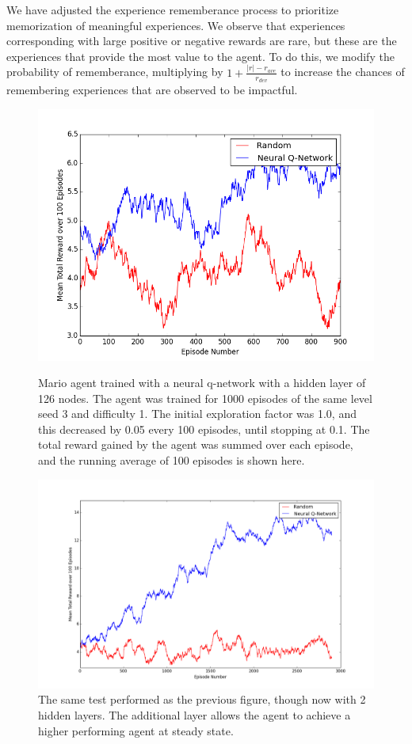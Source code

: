 \documentclass{article}
\begin{document}
We have adjusted the experience rememberance process to prioritize memorization of meaningful experiences. We observe that experiences corresponding with large positive or negative rewards are rare, but these are the experiences that provide the most value to the agent. To do this, we modify the probability of rememberance, multiplying by $1 + \frac{|r| - r_{ave}}{r_{dev}}$ to increase the chances of remembering experiences that are observed to be impactful.

 \begin{figure}
 \begin{center}
\includegraphics[scale=0.42]{seed3.png}
\caption{Mario agent trained with a neural q-network with a hidden layer of 126 nodes. The agent was trained for 1000 episodes of the same level seed 3 and difficulty 1. The initial exploration factor was 1.0, and this decreased by 0.05 every 100 episodes, until stopping at 0.1. The total reward gained by the agent was summed over each episode, and the running average of 100 episodes is shown here.}
\includegraphics[scale=0.25]{layer2_126_550144_3000.png}
\caption{The same test performed as the previous figure, though now with 2 hidden layers. The additional layer allows the agent to achieve a higher performing agent at steady state.}
\end{center}
\end{figure}
\end{document}
